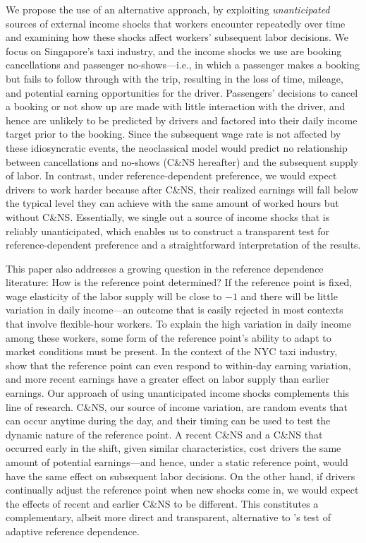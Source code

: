 \documentclass[reviewmode]{restat}
\begin{document}
We propose the use of an alternative approach, by exploiting \textit{unanticipated} sources of external 
income shocks that workers encounter repeatedly over time and examining how these shocks affect workers' 
subsequent labor decisions. We focus on Singapore's taxi industry, and the income shocks we use are 
booking cancellations and passenger no-shows---i.e., in which a passenger makes a booking but fails 
to follow through with the trip, resulting in the loss of time, mileage, and potential earning 
opportunities for the driver. Passengers' decisions to cancel a booking or not show up are made with 
little interaction with the driver, and hence are unlikely to be predicted by drivers and factored 
into their daily income target prior to the booking. Since the subsequent wage rate is not affected 
by these idiosyncratic events, the neoclassical model would predict no relationship between cancellations 
and no-shows (C\&NS hereafter) and the subsequent supply of labor. In contrast, under reference-dependent 
preference, we would expect drivers to work harder because after C\&NS, their realized earnings will fall 
below the typical level they can achieve with the same amount of worked hours but without C\&NS. 
Essentially, we single out a source of income shocks that is reliably unanticipated, which enables 
us to construct a transparent test for reference-dependent preference and a straightforward 
interpretation of the results.


This paper also addresses a growing question in the reference dependence literature: How is the 
reference point determined? If the reference point is fixed, wage elasticity of the labor supply will be
close to $-1$ and there will be little variation in daily income---an outcome that is easily rejected 
in most contexts that involve flexible-hour workers. To explain the high variation in daily income among 
these workers, some form of the reference point's ability to adapt to market conditions must be present. 
In the context of the NYC taxi industry, \citet{thakral2018daily} show that the reference point can even 
respond to within-day earning variation, and more recent earnings have a greater effect on labor supply 
than earlier earnings. Our approach of using unanticipated income shocks complements this line of research. 
C\&NS, our source of income variation, are random events that can occur anytime during the day, and their
timing can be used to test the dynamic nature of the reference point. A recent C\&NS and a C\&NS that 
occurred early in the shift, given similar characteristics, cost drivers the same amount of potential 
earnings---and hence, under a static reference point, would have the same effect on subsequent labor 
decisions. On the other hand, if drivers continually adjust the reference point when new shocks come in, 
we would expect the effects of recent and earlier C\&NS to be different. This constitutes a complementary, 
albeit more direct and transparent, alternative to  \citeauthor{thakral2018daily}'s test of adaptive 
reference dependence.
\end{document}
